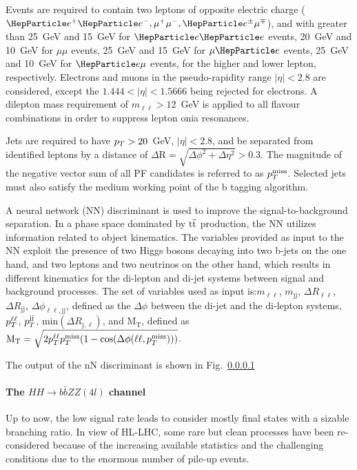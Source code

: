 Events are required to contain two leptons of opposite electric charge
($\Pe^{+}\Pe^{-}, \mu^{+}\mu^{-}, \Pe^{\pm}\mu^{\mp}$), and with \pt greater than 25~GeV and 15~GeV for
$\Pe\Pe$ events, 20~GeV and 10~GeV for $\mu\mu$ events, 25~GeV and 15~GeV for
$\mu\Pe$ events, 25~GeV and 10~GeV for $\Pe\mu$ events, for the higher and lower \pt lepton,
respectively. Electrons and muons in the pseudo-rapidity range
$| \eta | < 2.8$ are considered, except the $ 1.444 < | \eta | < 1.5666$ being rejected for electrons.
A dilepton mass requirement of $m_{\ell\ell} > 12$~GeV is applied to all flavour combinations in
order to suppress lepton onia resonances.


Jets are required to have
$p_{T} > 20$~GeV, $| \eta | < 2.8$, and be separated from identified leptons
by a distance of $\Delta \text{R} = \sqrt{\Delta \phi^2 + \Delta \eta^2} > 0.3$.
The magnitude of the negative vector sum of all PF candidates is referred
to as $p_{T}^\text{miss}$. 
Selected jets must also satisfy the medium working point of the b tagging algorithm.

A neural network (NN) discriminant is used to improve the signal-to-background
separation. In a phase space dominated by $\text{t}\overline{\text{t}}$ production, the NN utilizes information related
to object kinematics. The variables provided as input to the NN exploit the presence of two Higgs 
bosons decaying into two b-jets on the one hand, and two leptons and two neutrinos on the other hand, 
which results in different kinematics for the di-lepton and di-jet systems between signal and 
background processes. The set of variables used as input is:$ m_{\ell\ell}$, $m_\text{jj}$,
$\Delta R_{\ell\ell}$, $\Delta R_{\text{j}\text{j}}$, $\Delta \phi_{\ell\ell, \text{j}\text{j}}$, defined as 
the $\Delta \phi$ between the di-jet and the di-lepton systems, $p_{T}^{\ell\ell}$, $p_{T}^{\text{j}\text{j}}$,
min$\left(\Delta R_{\text{j}, \ell}\right)$, and $\mathrm{M}_\mathrm{T}$, defined as
$\mathrm{M}_\mathrm{T} = \sqrt{2 p_{T}^{\ell\ell} p_{T}^\text{miss} (1 - \cos(\Delta \phi(\ell\ell, p_{T}^\text{miss})))}$.

The output of the nN discriminant is shown in Fig.~\ref{} 


\paragraph{The $HH \rightarrow b\bar{b}ZZ(4l)$ channel}

Up to now, the low signal rate leads to consider mostly final states with a sizable branching ratio. In view of HL-LHC, some rare but clean processes have been re-considered because of the increasing available statistics and the challenging conditions due to the enormous number of pile-up events. 

